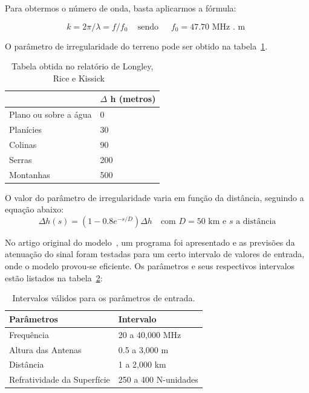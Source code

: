 Para obtermos o número de onda, basta aplicarmos a fórmula:

\[
k = 2\pi/\lambda = f/f_0 \,\,\,\,\, \text{ sendo} \,\,\,\,\,\,\,\,\, f_0 = 47.70 \text{ MHz . m }
\]

O parâmetro de irregularidade do terreno pode ser obtido na tabela~\ref{table:deltah}. \\

\begin{table}[h]
\centering
\caption[Valores para o parâmetro de irregularidade do terreno.]
{Tabela obtida no relatório de Longley, Rice  e Kissick ~\cite{longleyricedelta}} 
\label{table:deltah}
\begin{tabular}{ll}

\hline
                             & $\Delta$ h (metros) \\ \hline
Plano ou sobre a água        & 0                 \\
Planícies                    & 30                \\
Colinas                      & 90                \\
Serras                       & 200               \\
Montanhas                    & 500               
\end{tabular}
\end{table}


O valor do parâmetro de irregularidade varia em função da distância, seguindo a equação abaixo: 
\[
\Delta h(s) = (1-0.8e^{-s/D})\Delta h \,\,\,\, \text{ com $D = 50 $ km e $s$ a distância}
\]

No artigo original do modelo~\cite{longleyrice}, um programa foi apresentado e as previsões da atenuação do sinal foram testadas para um certo intervalo de valores de entrada, onde o modelo provou-se eficiente. Os parâmetros e seus respectivos intervalos estão listados na tabela~\ref{table:longleyricevaluesinterval}:\\

\begin{table}[h]
\centering
\caption[Intervalos válidos para os parâmetros de entrada.]
{Intervalos válidos para os parâmetros de entrada.}
\label{table:longleyricevaluesinterval}
\begin{tabular}{ll}
\hline
Parâmetros                  & Intervalo            \\ \hline
Frequência                  & 20 a 40,000 MHz      \\
Altura das Antenas          & 0.5 a 3,000 m        \\
Distância                   & 1 a 2,000 km         \\
Refratividade da Superfície & 250 a 400 N-unidades
\end{tabular}
\end{table}

